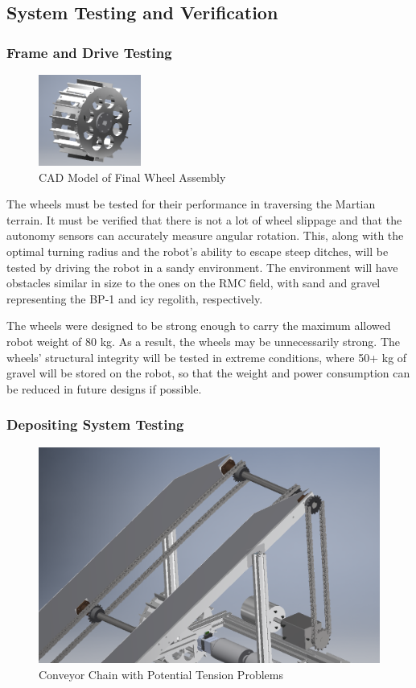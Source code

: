 \documentclass[class=article, crop=false]{standalone}
\begin{document}
	\subsection{System Testing and Verification}
	\label{subsec:system_testing_and_verification}
	
	
	
	\subsubsection{Frame and Drive Testing}
	
	\begin{figure}
		\centering
	 	\includegraphics[width=0.30\textwidth]{09_Figures/final_wheel.png}
	 	\caption{CAD Model of Final Wheel Assembly}
	 	\label{fig:fan-cad}
	\end{figure}	
	
	The wheels must be tested for their performance in traversing the Martian terrain. It must be verified that there is not a lot of wheel slippage and that the autonomy sensors can accurately measure angular rotation. This, along with the optimal turning radius and the robot's ability to escape steep ditches, will be tested by driving the robot in a sandy environment. The environment will have obstacles similar in size to the ones on the RMC field, with sand and gravel representing the BP-1 and icy regolith, respectively.

The wheels were designed to be strong enough to carry the maximum allowed robot weight of 80 kg.  As a result, the wheels may be unnecessarily strong. The wheels' structural integrity will be tested in extreme conditions, where 50+ kg of gravel will be stored on the robot, so that the weight and power consumption can be reduced in future designs if possible.

	\subsubsection{Depositing System Testing}
	
	\FloatBarrier
		\begin{figure}[h]
			\centering
			\includegraphics[width=0.5\linewidth]{09_Figures/conveyor_roller_chain.png}
			\caption{Conveyor Chain with Potential Tension Problems}
			\label{fig:conveyor_chain}
		\end{figure}
		\FloatBarrier
		
\end{document}
